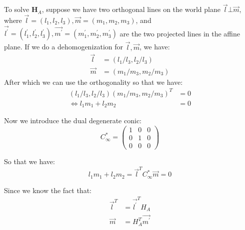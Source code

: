 \documentclass[conference]{IEEEtran}
\let\oldvec\vec
\renewcommand{\vec}[1]{\oldvec{\mathit{#1}}}
\newcommand{\mat}[1]{\mathbf{#1}} %
\begin{document}
\noindent To solve $\mat{H}_A$, suppose we have two orthogonal lines on the world plane $\vec{l}\bot \vec{m}$, where $\vec{l} = (l_1, l_2, l_3), \vec{m} = (m_1, m_2, m_3)$, and $\vec{l^\prime} = (l_1^\prime, l_2^\prime, l_3^\prime), \vec{m^\prime} = (m_1^\prime, m_2^\prime, m_3^\prime)$ are the two projected lines in the affine plane. If we do a dehomogenization for $\vec{l}, \vec{m}$, we have:
\begin{equation}
\begin{split}
	\vec{l} &= (l_1/l_3, l_2/l_3)\\
	\vec{m} &= (m_1/m_3, m_2/m_3)
\end{split}
\end{equation}
After which we can use the orthogonality so that we have:
\begin{equation}
\begin{split}
	(l_1/l_3, l_2/l_3)(m_1/m_3, m_2/m_3)^T &= 0\\
	\Leftrightarrow l_1m_1+l_2m_2 &= 0
\end{split}
\end{equation}

\noindent Now we introduce the dual degenerate conic:
\begin{equation}
	C^*_{\infty} =
	\begin{pmatrix}
		1 & 0 & 0\\
		0 & 1 & 0\\
		0 & 0 & 0
	\end{pmatrix}
\end{equation}

\noindent So that we have:
\begin{equation}
	l_1m_1 + l_2m_2 = \vec{l}^T C^*_{\infty} \vec{m} = 0
\end{equation}

\noindent Since we know the fact that:
\begin{equation}
	\begin{split}
	\vec{l}^T &= \vec{l^\prime}^TH_{A}\\
	\vec{m} &= H_{A}^T\vec{m^\prime}
	\end{split}
\end{equation}
\end{document}
